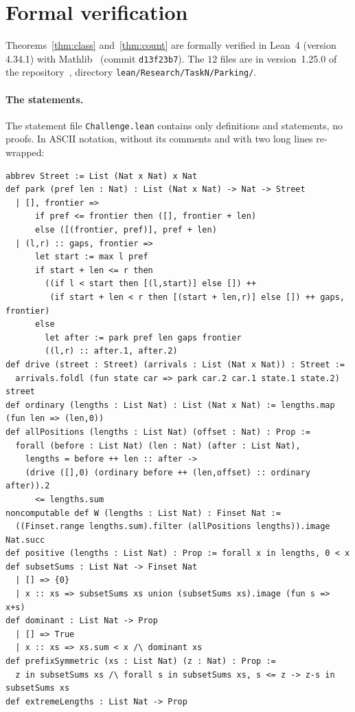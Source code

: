 \documentclass[11pt]{article}
\theoremstyle{remark}
\newcommand{\repoversion}{1.25.0}
\begin{document}
{\sloppy
\section{Formal verification}\label{sec:lean}

Theorems~\ref{thm:class} and~\ref{thm:count} are formally verified in Lean~4
(version 4.34.1) with Mathlib~\cite{mathlib} (commit \texttt{d13f23b7}). The
$12$ files are in version~\repoversion{} of the repository~\cite{repo},
directory \texttt{lean/Research/TaskN/Parking/}.

\paragraph{The statements.}
The statement file \texttt{Challenge.lean} contains only definitions and
statements, no proofs. In ASCII notation, without its comments and with two long lines re-wrapped:
{\footnotesize
\begin{verbatim}
abbrev Street := List (Nat x Nat) x Nat
def park (pref len : Nat) : List (Nat x Nat) -> Nat -> Street
  | [], frontier =>
      if pref <= frontier then ([], frontier + len)
      else ([(frontier, pref)], pref + len)
  | (l,r) :: gaps, frontier =>
      let start := max l pref
      if start + len <= r then
        ((if l < start then [(l,start)] else []) ++
         (if start + len < r then [(start + len,r)] else []) ++ gaps, frontier)
      else
        let after := park pref len gaps frontier
        ((l,r) :: after.1, after.2)
def drive (street : Street) (arrivals : List (Nat x Nat)) : Street :=
  arrivals.foldl (fun state car => park car.2 car.1 state.1 state.2) street
def ordinary (lengths : List Nat) : List (Nat x Nat) := lengths.map (fun len => (len,0))
def allPositions (lengths : List Nat) (offset : Nat) : Prop :=
  forall (before : List Nat) (len : Nat) (after : List Nat),
    lengths = before ++ len :: after ->
    (drive ([],0) (ordinary before ++ (len,offset) :: ordinary after)).2
      <= lengths.sum
noncomputable def W (lengths : List Nat) : Finset Nat :=
  ((Finset.range lengths.sum).filter (allPositions lengths)).image Nat.succ
def positive (lengths : List Nat) : Prop := forall x in lengths, 0 < x
def subsetSums : List Nat -> Finset Nat
  | [] => {0}
  | x :: xs => subsetSums xs union (subsetSums xs).image (fun s => x+s)
def dominant : List Nat -> Prop
  | [] => True
  | x :: xs => xs.sum < x /\ dominant xs
def prefixSymmetric (xs : List Nat) (z : Nat) : Prop :=
  z in subsetSums xs /\ forall s in subsetSums xs, s <= z -> z-s in subsetSums xs
def extremeLengths : List Nat -> Prop

\end{verbatim}}}
\end{document}
